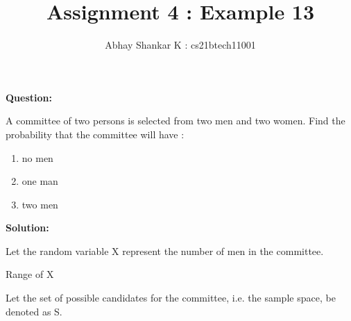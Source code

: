 \documentclass[journal,12pt,twocolumn]{IEEEtran}
\begin{document}
	\title{Assignment 4 : Example 13}
		\author{ Abhay Shankar K : cs21btech11001}

		\maketitle

		\bigskip

	\providecommand{\brak}[1]{\ensuremath{\left(#1\right)}}
	\providecommand{\sbrak}[1]{\ensuremath{\left[#1\right]}}
	\providecommand{\cbrak}[1]{\ensuremath{\left\{#1\right\}}}
	\providecommand{\abs}[1]{\left\vert#1\right\vert}
	\providecommand{\norm}[1]{\left\lVert#1\right\rVert}
	\newcommand{\solution}{\noindent \textbf{Solution: }}
	\newcommand{\question}{\noindent \textbf{Question: }}
	\providecommand{\pr}[2]{\ensuremath{P_{#1}\left(#2\right)}}
	\newcommand*{\permcomb}[4][0mu]{{{}^{#3}\mkern#1#2_{#4}}}
	\newcommand*{\perm}[1][-3mu]{\permcomb[#1]{P}}
	\newcommand*{\comb}[1][-1mu]{\permcomb[#1]{C}}

	\newcommand{\myvec}[1]{\ensuremath{\begin{pmatrix}#1\end{pmatrix}}}
	\let\vec\mathbf


	\question
	
	A committee of two persons is selected from two men and two women. Find the probability that the committee will have :
	\begin{enumerate}[label = \brak{\textbf{\roman*}}]
		
		\item no men
		
		\item one man
		
		\item two men
		
	\end{enumerate}
	
	
	\solution
	
	Let the random variable X represent the number of men in the committee.
	
	\begin{table}[h!tb]
	
		\centering
		
		\caption{Range of X}
		
		
		
		\label{table : range_table}
		
	\end{table}

	Let the set of possible candidates for the committee, i.e. the sample space, be denoted as S.
	
\end{document}
